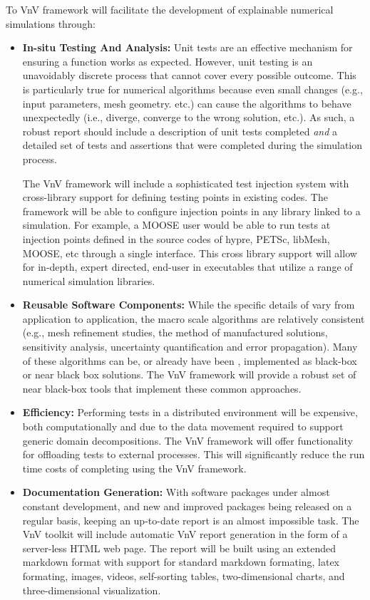 To VnV framework will facilitate the development of explainable numerical simulations through:

\begin{itemize}
 
 \item{ \bf In-situ Testing And Analysis:} Unit tests are an effective mechanism for ensuring a function works as expected. However, unit testing is an unavoidably discrete process that cannot cover every possible outcome. This is particularly true for numerical algorithms because even small changes (e.g., input parameters, mesh geometry. etc.) can cause the algorithms to behave unexpectedly (i.e., diverge, converge to the wrong solution, etc.). As such, a robust \VV report should include a description of unit tests completed \emph{and} a detailed set of tests and assertions that were completed during the simulation process. 
 
 The VnV framework will include a sophisticated test injection system with cross-library support for defining testing points in existing codes. The framework will be able to configure injection points in any library linked to a simulation. For example, a MOOSE user would be able to run \VV tests at injection points defined in the source codes of hypre, PETSc, libMesh, MOOSE, etc through a single interface. This cross library support will allow for in-depth, expert directed, end-user \VV in executables that utilize a range of numerical simulation libraries. 
 
 \item {\bf Reusable Software Components:} While the specific details of \VV vary from application to application, the macro scale algorithms are relatively consistent (e.g., mesh refinement studies, the method of manufactured solutions, sensitivity analysis, uncertainty quantification and error propagation). Many of these algorithms can be, or already have been \cite{DAKOTA},  implemented as black-box or near black box solutions. The VnV framework will provide a robust set of near black-box tools that implement these common \VV approaches. 
  
 \item{\bf Efficiency:}  Performing \VV tests in a distributed environment will be expensive, both computationally and due to the data movement required to support generic domain decompositions. The VnV framework will offer functionality for offloading tests to external processes. This will significantly reduce the run time costs of completing \VV using the VnV framework.
 
 \item{\bf Documentation Generation:} With software packages under almost constant development, and new and improved packages being released on a regular basis, keeping an up-to-date \VV report is an almost impossible task. The VnV toolkit will include automatic VnV report generation in the form of a server-less HTML web page. The report will be built using an extended markdown format with support for standard markdown formating, latex formating, images, videos, self-sorting tables, two-dimensional charts, and three-dimensional visualization. 
 \end{itemize}

